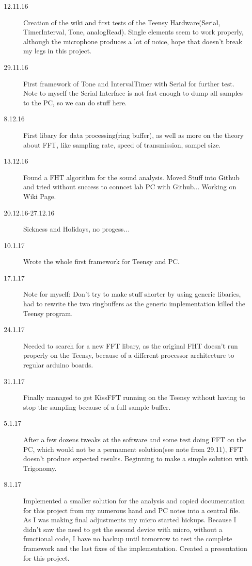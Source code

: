 \documentclass{book}
\begin{document}
\begin{description}
\item[12.11.16]Creation of the wiki and first tests of the Teensy Hardware(Serial, TimerInterval, Tone, analogRead). Single elements seem to work properly, although the microphone produces a lot of noice, hope that doesn't break my legs in this project.
\item[29.11.16]First framework of Tone and IntervalTimer with Serial for further test. Note to myself the Serial Interface is not fast enough to dump all samples to the PC, so we can do stuff here.
\item[8.12.16]First libary for data processing(ring buffer), as well as more on the theory about FFT, like sampling rate, speed of transmission, sampel size.
\item[13.12.16]Found a FHT algorithm for the sound analysis. Moved Stuff into Github and tried without success to conncet lab PC with Github... Working on Wiki Page.
\item[20.12.16-27.12.16]Sickness and Holidays, no progess...
\item[10.1.17]Wrote the whole first framework for Teensy and PC.
\item[17.1.17] Note for myself: Don't try to make stuff shorter by using generic libaries, had to rewrite the two ringbuffers as the generic implementation killed the Teensy program.
\item[24.1.17]Needed to search for a new FFT libary, as the original FHT doesn't run properly on the Teensy, because of a different processor architecture to regular arduino boards.
\item[31.1.17]Finally managed to get KissFFT running on the Teensy without having to stop the sampling because of a full sample buffer.
\item[5.1.17]After a few dozens tweaks at the software and some test doing FFT on the PC, which would not be a permament solution(see note from 29.11), FFT doesn't produce expected results. Beginning to make a simple solution with Trigonomy.
\item[8.1.17]Implemented a smaller solution for the analysis and copied documentation for this project from my numerous hand and PC notes into a central file. As I was making final adjustments my micro started hickups. Because I didn't saw the need to get the second device with micro, without a functional code, I have no backup until tomorrow to test the complete framework and the last fixes of the implementation. Created a presentation for this project.
\end{description}
\end{document}
